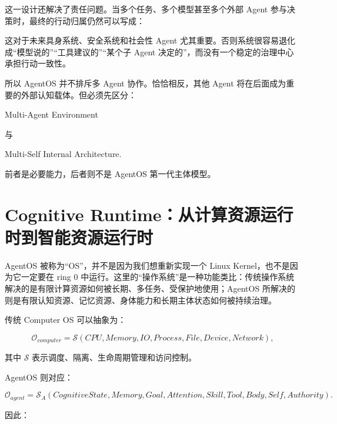 这一设计还解决了责任问题。当多个任务、多个模型甚至多个外部 Agent 参与决策时，最终的行动归属仍然可以写成：

\begin{statementbox}
\centering
{}
\end{statementbox}

这对于未来具身系统、安全系统和社会性 Agent 尤其重要。否则系统很容易退化成“模型说的”“工具建议的”“某个子 Agent 决定的”，而没有一个稳定的治理中心承担行动一致性。

所以 AgentOS 并不排斥多 Agent 协作。恰恰相反，其他 Agent 将在后面成为重要的外部认知载体。但必须先区分：

\begin{statementbox}
Multi-Agent Environment
\end{statementbox}

与

\begin{statementbox}
Multi-Self Internal Architecture.
\end{statementbox}

前者是必要能力，后者则不是 AgentOS 第一代主体模型。

\section{Cognitive Runtime：从计算资源运行时到智能资源运行时}

AgentOS 被称为“OS”，并不是因为我们想重新实现一个 Linux Kernel，也不是因为它一定要在 ring 0 中运行。这里的“操作系统”是一种功能类比：传统操作系统解决的是有限计算资源如何被长期、多任务、受保护地使用；AgentOS 所解决的则是有限认知资源、记忆资源、身体能力和长期主体状态如何被持续治理。

传统 Computer OS 可以抽象为：

\[
\mathcal{O}_{computer}
=
\mathcal{S}
(
CPU,
Memory,
IO,
Process,
File,
Device,
Network
),
\]

其中 $\mathcal{S}$ 表示调度、隔离、生命周期管理和访问控制。

AgentOS 则对应：

\[
\mathcal{O}_{agent}
=
\mathcal{S}_A
(
CognitiveState,
Memory,
Goal,
Attention,
Skill,
Tool,
Body,
Self,
Authority
).
\]

因此：

\begin{statementbox}
\centering
{}
\end{statementbox}

